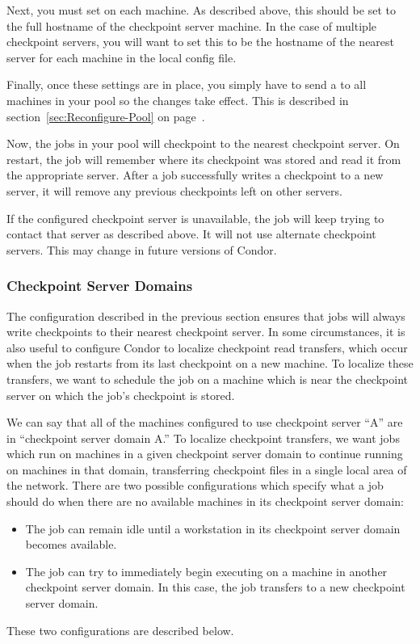 Next, you must set  on each machine.
As described above, this should be set to the full hostname of the
checkpoint server machine.
In the case of multiple checkpoint servers, you will want to set this
to be the hostname of the nearest server for each machine in the local
config file.

Finally, once these settings are in place, you simply have to send a
 to all machines in your pool so the changes take
effect.
This is described in section~\ref{sec:Reconfigure-Pool} on
page~\pageref{sec:Reconfigure-Pool}.

Now, the jobs in your pool will checkpoint to the nearest checkpoint
server.
On restart, the job will remember where its checkpoint was
stored and read it from the appropriate server.
After a job successfully writes a checkpoint to a new server, it will
remove any previous checkpoints left on other servers.

\Note If the configured checkpoint server is unavailable, the job will
keep trying to contact that server as described above.
It will not use alternate checkpoint servers.
This may change in future versions of Condor.

\subsubsection{\label{sec:Checkpoint-Server-Domains} 
Checkpoint Server Domains}

The configuration described in the previous section ensures that jobs
will always write checkpoints to their nearest checkpoint server.  In
some circumstances, it is also useful to configure Condor to localize
checkpoint read transfers, which occur when the job restarts from its
last checkpoint on a new machine.  To localize these transfers, we
want to schedule the job on a machine which is near the checkpoint
server on which the job's checkpoint is stored.

We can say that all of the machines configured to use checkpoint
server ``A'' are in ``checkpoint server domain A.''  To localize
checkpoint transfers, we want jobs which run on machines in a given
checkpoint server domain to continue running on machines in that
domain, transferring checkpoint files in a single local area of the
network.  There are two possible configurations which specify what a
job should do when there are no available machines in its checkpoint
server domain:
\begin{itemize}
\item The job can remain idle until a workstation in its checkpoint
server domain becomes available.
\item The job can try to immediately begin executing on a machine
in another checkpoint server domain.  In this case, the job transfers
to a new checkpoint server domain.
\end{itemize}
These two configurations are described below.

